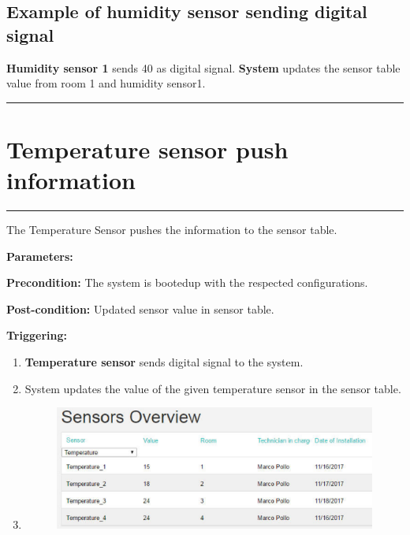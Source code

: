 \subsection{Example of humidity sensor sending digital signal}
\textbf{Humidity sensor 1} sends 40 as digital signal. \textbf{System} updates
the sensor table value from room 1 and humidity sensor1.
\hfill
\vspace{0.5cm}
\hrule


\section{Temperature sensor push information}

\hrule
\hfill
\vspace{0.5cm}
\label{operation:Temperature sensor push information}

The Temperature Sensor pushes the information to the sensor table.
\begin{description}
\item \textbf{Parameters:} 
\item \textbf{Precondition:} The system is bootedup with the respected
configurations.
\item \textbf{Post-condition:} Updated sensor value in sensor table.

\item \textbf{Triggering:}
\begin{enumerate}
\item \textbf{Temperature sensor} sends digital signal to the system.
\item System updates the value of the given temperature sensor in the sensor
table.
\item \begin{figure}[H]
\includegraphics[width=1\textwidth]{images/TemperatureSensor.eps}
\end{figure}
\end{enumerate}
\end{description}

